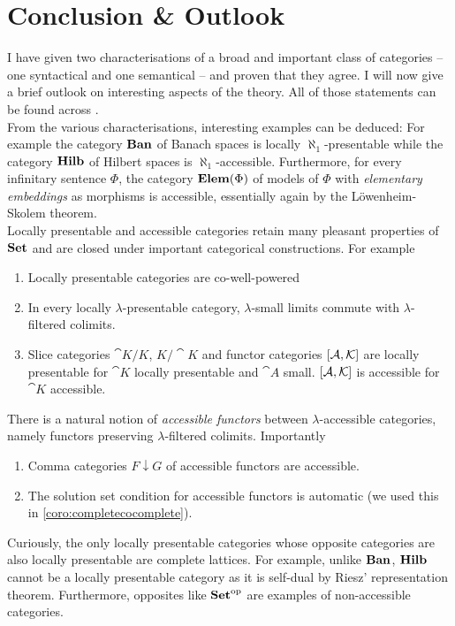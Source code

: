 \section{Conclusion \& Outlook}
\label{sec:conclusion}

I have given two characterisations of a broad and important class of categories -- one syntactical and one semantical -- and proven that they agree. I will now give a brief outlook on interesting aspects of the theory. All of those statements can be found across \cite{AdamekRosicky}. \\

From the various characterisations, interesting examples can be deduced: For example the category $\mathbf{Ban}$ of Banach spaces is locally $\aleph_1$-presentable while the category $\mathbf{Hilb}$ of Hilbert spaces is $\aleph_1$-accessible. Furthermore, for every infinitary sentence $\Phi$, the category $\mathbf{Elem}(\Phi)$ of models of $\Phi$ with \emph{elementary embeddings} as morphisms is accessible, essentially again by the Löwenheim-Skolem theorem. \\

Locally presentable and accessible categories retain many pleasant properties of $\mathbf{Set}$ and are closed under important categorical constructions. For example
\begin{enumerate}
\item Locally presentable categories are co-well-powered
\item In every locally $\lambda$-presentable category, $\lambda$-small limits commute with $\lambda$-filtered colimits.
\item Slice categories $\cat K/K$, $K/\cat K$ and functor categories $[\mathcal{A},\mathcal{K}]$ are locally presentable for $\cat K$ locally presentable and $\cat A$ small. $[\mathcal{A},\mathcal{K}]$ is accessible for $\cat K$ accessible.
\end{enumerate}
There is a natural notion of \emph{accessible functors} between $\lambda$-accessible categories, namely functors preserving $\lambda$-filtered colimits. Importantly
\begin{enumerate}[resume]
\item Comma categories $F \downarrow G$ of accessible functors are accessible.
\item The solution set condition for accessible functors is automatic (we used this in \ref{coro:completecocomplete}).
\end{enumerate}
Curiously, the only locally presentable categories whose opposite categories are also locally presentable are complete lattices. For example, unlike $\mathbf{Ban}$, $\mathbf{Hilb}$ cannot be a locally presentable category as it is self-dual by Riesz' representation theorem. Furthermore, opposites like $\mathbf{Set}^{\textrm{op}}$ are examples of non-accessible categories. \\

